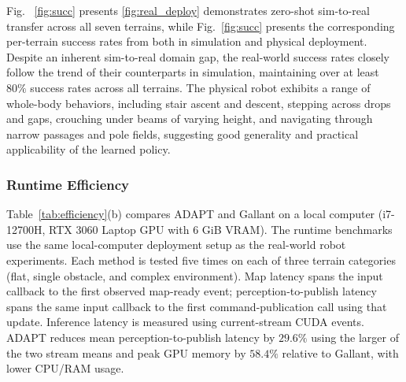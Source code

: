 \documentclass[letterpaper, 10 pt, conference]{ieeeconf/ieeeconf}
\providecommand{\DIFadd}[1]{{\protect\color{blue} \sf #1}} %
\providecommand{\DIFdel}[1]{{\protect\color{red} \scriptsize #1}} %
\providecommand{\DIFaddbegin}{} %
\providecommand{\DIFaddend}{} %
\providecommand{\DIFdelbegin}{} %
\providecommand{\DIFdelend}{} %
\begin{document}
Fig.~\DIFdelbegin \DIFdel{\ref{fig:succ} presents }\DIFdelend \DIFaddbegin \DIFadd{\ref{fig:real_deploy} demonstrates zero-shot sim-to-real transfer across all seven terrains, while Fig.~\ref{fig:succ} presents the corresponding }\DIFaddend per-terrain success rates \DIFdelbegin \DIFdel{from both }\DIFdelend \DIFaddbegin \DIFadd{in }\DIFaddend simulation and physical deployment. Despite an inherent sim-to-real domain gap, the real-world success rates closely follow the trend of their counterparts in simulation, maintaining \DIFdelbegin \DIFdel{over }\DIFdelend \DIFaddbegin \DIFadd{at least }\DIFaddend $80\%$ success rates across all terrains. The physical robot exhibits a range of whole-body behaviors, including stair ascent and descent, stepping across drops and gaps, crouching under beams of varying height, and navigating through narrow passages and pole fields, suggesting good generality and practical applicability of the learned policy. 

\DIFaddbegin \subsubsection{\DIFadd{Runtime Efficiency}}
\DIFadd{Table~\ref{tab:efficiency}(b) compares ADAPT and Gallant on a local computer (i7-12700H, RTX 3060 Laptop GPU with 6 GiB VRAM). The runtime benchmarks use the same local-computer deployment setup as the real-world robot experiments. Each method is tested five times on each of three terrain categories (flat, single obstacle, and complex environment). Map latency spans the input callback to the first observed map-ready event; perception-to-publish latency spans the same input callback to the first command-publication call using that update. Inference latency is measured using current-stream CUDA events. ADAPT reduces mean perception-to-publish latency by $29.6\%$ using the larger of the two stream means and peak GPU memory by $58.4\%$ relative to Gallant, with lower CPU/RAM usage.
}

\DIFaddend %

\end{document}
